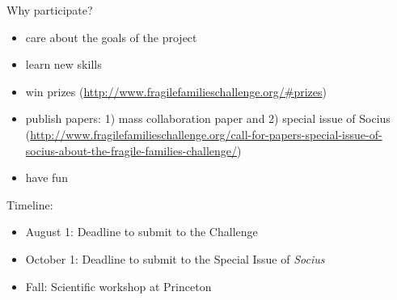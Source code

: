 \documentclass{beamer}
\begin{document}
\begin{frame}

Why participate?
\begin{itemize}
\pause
\item care about the goals of the project
\pause
\item learn new skills
\pause
\item win prizes ({\tiny \url{http://www.fragilefamilieschallenge.org/\#prizes}})
\pause
\item publish papers: 1) mass collaboration paper and 2) special issue of Socius ({\tiny \url{http://www.fragilefamilieschallenge.org/call-for-papers-special-issue-of-socius-about-the-fragile-families-challenge/}})
\pause
\item have fun
\end{itemize}

\end{frame}
\begin{frame}

Timeline:
\begin{itemize}
\item August 1: Deadline to submit to the Challenge
\item October 1: Deadline to submit to the Special Issue of \textit{Socius}
\item Fall: Scientific workshop at Princeton
\end{itemize}

\end{frame}
\end{document}
